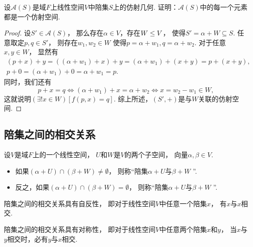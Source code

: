 \begin{example}
设\(\mathcal{A}(S)\)是域\(F\)上线性空间\(V\)中陪集\(S\)上的仿射几何.
证明：\(\mathcal{A}(S)\)中的每一个元素都是一个仿射空间.
\begin{proof}
设\(S' \in \mathcal{A}(S)\)，
那么存在\(\alpha \in V\)，存在\(W \leq V\)，
使得\(S' = \alpha + W \subseteq S\).
任意取定\(p,q \in S'\)，
则存在\(w_1,w_2 \in W\)
使得\(p = \alpha + w_1, q = \alpha + w_2\).
对于任意\(x,y \in W\)，
显然有\begin{gather*}
	(p + x) + y
	= ((\alpha + w_1) + x) + y
	= (\alpha + w_1) + (x + y)
	= p + (x + y),
	\\
	p + 0
	= (\alpha + w_1) + 0
	= \alpha + w_1
	= p.
\end{gather*}
同时，我们还有\begin{equation*}
	p + x = q
	\iff
	(\alpha + w_1) + x = \alpha + w_2
	\iff
	x = w_2 - w_1 \in W,
\end{equation*}
这就说明\(
	(\exists! x \in W)
	[
		f(p,x) = q
	]
\).
综上所述，\((S',+)\)是与\(W\)关联的仿射空间.
\end{proof}
\end{example}

\subsection{陪集之间的相交关系}
\begin{definition}
设\(V\)是域\(F\)上的一个线性空间，
\(U\)和\(W\)是\(V\)的两个子空间，
向量\(\alpha,\beta \in V\).
\begin{itemize}
	\item 如果\((\alpha + U) \cap (\beta + W) \neq \emptyset\)，
	则称“陪集\(\alpha + U\)与\(\beta + W\) ”.

	\item 反之，如果\((\alpha + U) \cap (\beta + W) = \emptyset\)，
	则称“陪集\(\alpha + U\)与\(\beta + W\) ”.
\end{itemize}
\end{definition}

\begin{property}
陪集之间的相交关系具有自反性，
即对于线性空间\(V\)中任意一个陪集\(x\)，
有\(x\)与\(x\)相交.
\end{property}

\begin{property}
陪集之间的相交关系具有对称性，
即对于线性空间\(V\)中任意两个陪集\(x\)和\(y\)，
当\(x\)与\(y\)相交时，必有\(y\)与\(x\)相交.
\end{property}

